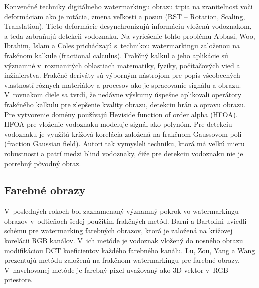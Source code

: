 Konvenčné techniky digitálneho watermarkingu obrazu trpia na zraniteľnosť voči deformáciam ako je rotácia, zmena veľkosti a posun (RST – Rotation, Scaling, Translation). Tieto deformácie desynchronizujú informáciu vloženú vodoznakom, a teda zabraňujú detekcii vodoznaku. Na vyriešenie tohto problému Abbasi, Woo, Ibrahim, Islam a Coles \cite{Abbasi2015} prichádzajú s~technikou watermarkingu založenou na frakčnom kalkule (fractional calculus). Frakčný kalkul a jeho aplikácie sú významné v~rozmanitých oblastiach matematiky, fyziky, počítačových vied a inžinierstva. Frakčné deriváty sú výborným nástrojom pre popis všeobecných vlastností rôznych materiálov a procesov ako je spracovanie signálu a obrazu. V~rovnakom diele sa tvrdí, že nedávne výskumy úspešne aplikovali operátory frakčného kalkulu pre zlepšenie kvality obrazu, detekciu hrán a opravu obrazu. Pre vytvorenie domény používajú Heviside function of order alpha (HFOA). HFOA pre vloženie vodoznaku modeluje signál ako polynóm. Pre detekciu vodoznaku je využitá krížová korelácia založená na frakčnom Gaussovom poli (fraction Gaussian field). Autori tak vymysleli techniku, ktorá má veľkú mieru robustnosti a patrí medzi blind vodoznaky, čiže pre detekciu vodoznaku nie je potrebný pôvodný obraz.

\subsection{Farebné obrazy}
V~posledných rokoch bol zaznamenaný významný pokrok vo watermarkingu obrazov v~odtieňoch šedej použitím frakčných metód. Barni a Bartolini \cite{Barni} uviedli schému pre watermarking farebných obrazov, ktorá je založená na krížovej korelácii RGB kanálov. V~ich metóde je vodoznak vložený do nosného obrazu modifikáciou DCT koeficientov každého farebného kanálu. Lu, Zou, Yang a Wang \cite{Lu-fractal} prezentujú metódu založenú na frakčnom watermarkingu pre farebné obrazy. V~navrhovanej metóde je farebný pixel uvažovaný ako 3D vektor v~RGB priestore.

